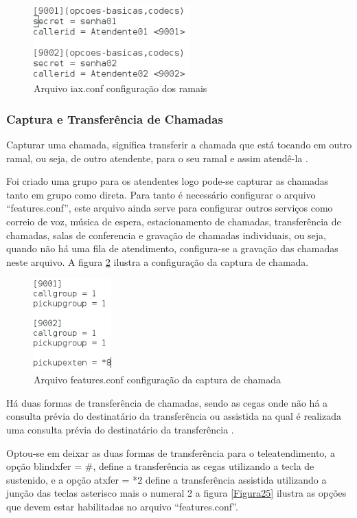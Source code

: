 \begin{figure}[h]
	\centering
	\includegraphics[width=6cm]{imagens/iax.png}
	\caption{Arquivo iax.conf configuração dos ramais}
    \label{Figura23}
\end{figure}

\subsubsection{Captura e Transferência de Chamadas}
Capturar uma chamada, significa transferir a chamada que está tocando em outro ramal, ou seja, de outro atendente, para o seu ramal e assim atendê-la \cite{alexandrekeller2014}.

Foi criado uma grupo para os atendentes logo pode-se capturar as chamadas tanto em grupo como direta. Para tanto é necessário configurar o arquivo ``features.conf'', este arquivo ainda serve para configurar outros serviços como correio de voz, música de espera, estacionamento de chamadas, transferência de chamadas, salas de conferencia e gravação de chamadas individuais, ou seja, quando não há uma fila de atendimento, configura-se a gravação das chamadas neste arquivo. A figura \ref{Figura24} ilustra a configuração da captura de chamada.

\begin{figure}[h]
	\centering
	\includegraphics[width=3cm]{imagens/features.png}
	\caption{Arquivo features.conf configuração da captura de chamada}
    \label{Figura24}
\end{figure}

Há duas formas de transferência de chamadas, sendo as cegas onde não há a consulta prévia do destinatário da transferência ou assistida na qual é realizada uma consulta prévia do destinatário da transferência \cite{alexandrekeller2014}.

Optou-se em deixar as duas formas de transferência para o teleatendimento, a opção blindxfer = \#, define a transferência as cegas utilizando a tecla de sustenido, e a opção atxfer = *2 define a transferência assistida utilizando a junção das teclas asterisco mais o numeral 2 a figura \ref{Figura25} ilustra as opções que devem estar habilitadas no arquivo ``features.conf''.

